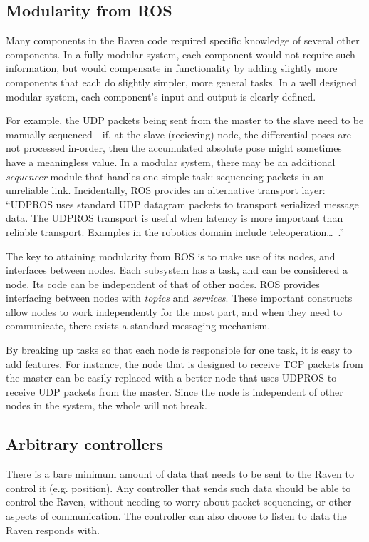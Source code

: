 \documentclass[letterpaper,twocolumn,10pt]{article}
\begin{document}
\subsection{Modularity from ROS}

Many components in the Raven code required specific knowledge of
several other components. In a fully modular system, each component
would not require such information, but would compensate in
functionality by adding slightly more components that each do slightly
simpler, more general tasks. In a well designed modular system, each
component's input and output is clearly defined.

For example, the UDP packets being sent from the master to the slave
need to be manually sequenced---if, at the slave (recieving) node, the
differential poses are not processed in-order, then the accumulated
absolute pose might sometimes have a meaningless value. In a modular
system, there may be an additional \emph{sequencer} module that
handles one simple task: sequencing packets in an unreliable
link. Incidentally, ROS provides an alternative transport layer:
``UDPROS uses standard UDP datagram packets to transport serialized
message data. The UDPROS transport is useful when latency is more
important than reliable transport. Examples in the robotics domain
include teleoperation\ldots~\cite{udpros}.''

The key to attaining modularity from ROS is to make use of its nodes, 
and interfaces between nodes. Each subsystem has a task, and can be 
considered a node. Its code can be independent of that of other nodes. 
ROS provides interfacing between nodes with \emph{topics} and 
\emph{services}. These important constructs allow nodes to work 
independently for the most part, and when they need to communicate, 
there exists a standard messaging mechanism.

By breaking up tasks so that each node is responsible for one task, 
it is easy to add features. For instance, the node that is designed 
to receive TCP packets from the master can be easily replaced with 
a better node that uses UDPROS to receive UDP packets from the master. 
Since the node is independent of other nodes in the system, the whole 
will not break.


\subsection{Arbitrary controllers}
There is a bare minimum amount of data that needs to be sent to the 
Raven to control it (e.g. position). Any controller that sends such 
data should be able to control the Raven, without needing to worry 
about packet sequencing, or other aspects of communication. The 
controller can also choose to listen to data the Raven responds with. 
\end{document}
